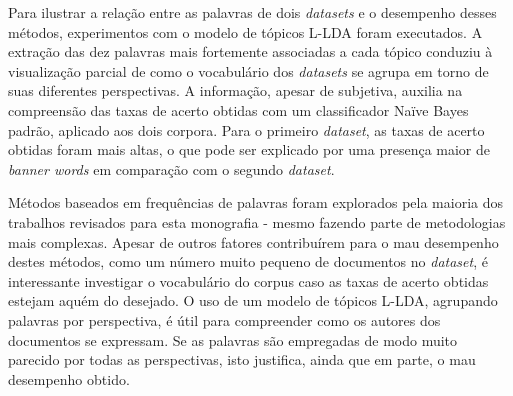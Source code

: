 
Para ilustrar a relação entre as palavras de dois \emph{datasets} e o desempenho desses métodos, experimentos com o modelo de tópicos L-LDA foram executados. A extração das dez palavras mais fortemente associadas a cada tópico conduziu à visualização parcial de como o vocabulário dos \emph{datasets} se agrupa em torno de suas diferentes perspectivas. A informação, apesar de subjetiva, auxilia na compreensão das taxas de acerto obtidas com um classificador Naïve Bayes padrão, aplicado aos dois corpora. Para o primeiro \emph{dataset}, as taxas de acerto obtidas foram mais altas, o que pode ser explicado por uma presença maior de \emph{banner words} em comparação com o segundo \emph{dataset}.

Métodos baseados em frequências de palavras foram explorados pela maioria dos trabalhos revisados para esta monografia - mesmo fazendo parte de metodologias mais complexas. Apesar de outros fatores contribuírem para o mau desempenho destes métodos, como um número muito pequeno de documentos no \emph{dataset}, é interessante investigar o vocabulário do corpus caso as taxas de acerto obtidas estejam aquém do desejado. O uso de um modelo de tópicos L-LDA, agrupando palavras por perspectiva, é útil para compreender como os autores dos documentos se expressam. Se as palavras são empregadas de modo muito parecido por todas as perspectivas, isto justifica, ainda que em parte, o mau desempenho obtido.


